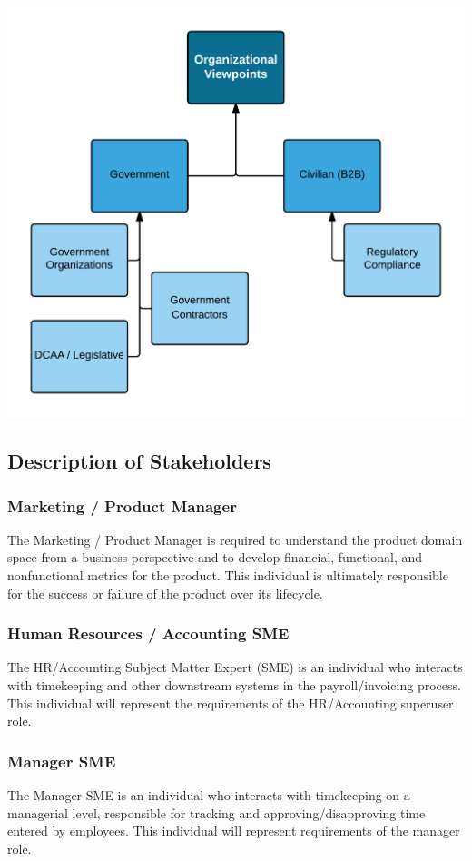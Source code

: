 \documentclass[12pt]{article}
\begin{document}
\begin{center}
	\includegraphics{Graphs/OrgView}
\end{center}

\subsection{Description of Stakeholders}

\subsubsection{Marketing / Product Manager}
The Marketing / Product Manager is required to understand the product domain space from a business perspective and to develop financial, functional, and nonfunctional metrics for the product.  This individual is ultimately responsible for the success or failure of the product over its lifecycle.

\subsubsection{Human Resources / Accounting  SME}
The HR/Accounting Subject Matter Expert (SME) is an individual who interacts with timekeeping and other downstream systems in the payroll/invoicing process.  This individual will represent the requirements of the HR/Accounting superuser role.

\subsubsection{Manager SME}
The Manager SME is an individual who interacts with timekeeping on a managerial level, responsible for tracking and approving/disapproving time entered by employees.  This individual will represent requirements of the manager role.
\end{document}
